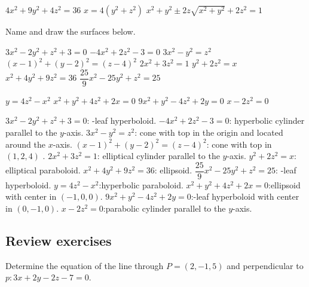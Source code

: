 	\begin{Answer}\phantom{}
	    \begin{multicols}{2}
    		\Question 
    		$4x^2 + 9y^2 +4z^2 = 36$
    		\Question 
    		$x=4(y^2+z^2)$
    		\Question 
    		$x^2 + y^2 \pm 2z \sqrt{x^2+y^2} + 2z^2 = 1$
    	\EndCurrentQuestion
    	\end{multicols}
	\end{Answer}
\fi	

\begin{Exercise}[difficulty = 1] Name and draw the surfaces below.
	\begin{multicols}{2}
		\Question $3x^2-2y^2+z^2+3=0$ 
		\Question $-4x^2+2z^2-3=0$ 
		\Question $3x^2-y^2=z^2$ 
		\Question $(x-1)^2+(y-2)^2=(z-4)^2$ 
		\Question $2x^2+3z^2=1$ 
		\Question $y^2 + 2 z^2 = x$  
		\Question $x^2 + 4y^2 + 9z^2 = 36$ 
		\Question $\dfrac{25}{9}x^2 - 25 y^2 + z^2 = 25$ 
		
		\ifcalculus
		\Question $y=4z^2-x^2$
		\Question $x^2+y^2+4z^2+2x=0$
		\Question $9x^2+y^2-4z^2+2y=0$
		\Question $x-2z^2=0$
		\fi
	    \EndCurrentQuestion
	\end{multicols}

\end{Exercise}

\begin{Answer}\phantom{}
   
		\Question $3x^2-2y^2+z^2+3=0$: -leaf hyperboloid.
		\Question $-4x^2+2z^2-3=0$: \quad  hyperbolic cylinder parallel to the $y$-axis.
		\Question $3x^2-y^2=z^2$: \quad  cone with top in the origin and located around the $x$-axis.
		\Question $(x-1)^2+(y-2)^2=(z-4)^2$: \quad cone with top in $(1,2,4)$ .
		\Question $2x^2+3z^2=1$: \quad elliptical cylinder parallel to the $y$-axis.
		\Question $y^2 + 2 z^2 = x$: \quad  elliptical paraboloid.
		\Question $x^2 + 4y^2 + 9z^2 = 36$: \quad ellipsoid.
		\Question $\dfrac{25}{9}x^2 - 25 y^2 + z^2 = 25$: -leaf hyperboloid. 
		\ifcalculus
		\Question $y=4z^2-x^2$:\quad hyperbolic paraboloid.
		\Question $x^2+y^2+4z^2+2x=0$:\quad ellipsoid with center in $(-1,0,0)$.
		\Question $9x^2+y^2-4z^2+2y=0$:-leaf hyperboloid with center in $(0,-1,0)$.
		\Question $x-2z^2=0$:\quad parabolic cylinder parallel to the $y$-axis.
		\fi
\end{Answer}


\subsection*{Review exercises}
\begin{Exercise}[difficulty = 1]
Determine the equation of the line through  $P=(2,-1,5)$ and perpendicular to $p: 3x+2y-2z-7=0$.

\end{Exercise}

